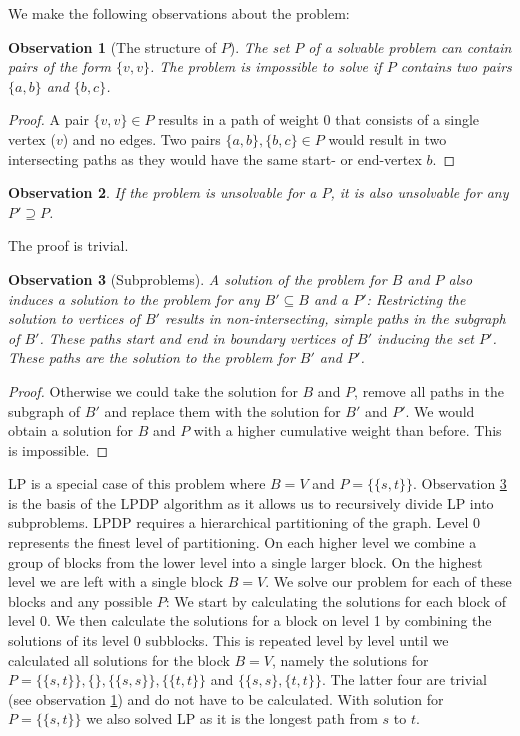 \documentclass[11pt]{article}
\begin{document}
We make the following observations about the problem:
\newtheorem{observation}{Observation}
\begin{observation}[The structure of $P$]\label{structureOfP}
The set $P$ of a solvable problem can contain pairs of the form $\{v,v\}$. The problem is impossible to solve if $P$ contains two pairs $\{a,b\}$ and $\{b,c\}$.
\end{observation}
\begin{proof}
A pair $\{v,v\} \in P$ results in a path of weight 0 that consists of a single vertex ($v$) and no edges. Two pairs $\{a,b\},\{b,c\} \in P$ would result in two intersecting paths as they would have the same start- or end-vertex $b$.
\end{proof}

\begin{observation}\label{unsolvable}
If the problem is unsolvable for a $P$, it is also unsolvable for any $P' \supseteq P$. 
\end{observation}
 \noindent The proof is trivial.

\begin{observation}[Subproblems]\label{subproblem}
A solution of the problem for $B$ and $P$ also induces a solution to the problem for any $B' \subseteq B$ and a $P'$: Restricting the solution to vertices of $B'$ results in non-intersecting, simple paths in the subgraph of $B'$. These paths start and end in boundary vertices of $B'$ inducing the set $P'$. These paths are the solution to the problem for $B'$ and $P'$.
\end{observation}
\begin{proof}
Otherwise we could take the solution for $B$ and $P$, remove all paths in the subgraph of $B'$ and replace them with the solution for $B'$ and $P'$. We would obtain a solution for $B$ and $P$ with a higher cumulative weight than before. This is impossible.
\end{proof}

LP is a special case of this problem where $B = V$  and $P = \{\{s,t\}\}$. Observation \ref{subproblem} is the basis of the LPDP algorithm as it allows us to recursively divide LP into subproblems. 
LPDP requires a hierarchical partitioning of the graph. Level 0 represents the finest level of partitioning. On each higher level we combine a group of blocks from the lower level into a single larger block. On the highest level we are left with a single block $B = V$. We solve our problem for each of these blocks and any possible $P$: We start by calculating the solutions for each block of level 0. We then calculate the solutions for a block on level 1 by combining the solutions of its level 0 subblocks. This is repeated level by level until we calculated all solutions for the block $B = V$, namely the solutions for $P= \{\{s,t\}\}, \{\}, \{\{s,s\}\}, \{\{t,t\}\}$ and $\{\{s,s\}, \{t,t\}\}$. The latter four are trivial (see observation \ref{structureOfP}) and do not have to be calculated. With solution for $P= \{\{s,t\}\}$ we also solved LP as it is the longest path from $s$ to $t$.
\end{document}
